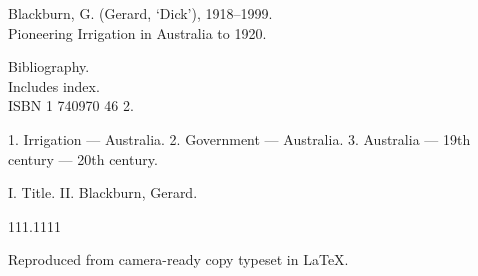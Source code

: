 \documentclass[11pt,b5paper,titlepage]{book}
\newcommand{\clearemptydoublepage}{\newpage{\pagestyle{empty}\cleardoublepage}}
\renewcommand{\headrulewidth}{0pt}%
\begin{document}
\begin{titlepage}
\begin{raggedright}
\medskip
Blackburn, G. (Gerard, `Dick'), 1918--1999.\\
Pioneering Irrigation in Australia to 1920.\\
\begin{list}{}{\setlength{\topsep}{0ex}\setlength{\itemsep}{0ex}\setlength{\leftmargin}{2.5ex}}
\item
Bibliography.\\
Includes index.\\
ISBN 1 740970 46 2.

\item
1. Irrigation --- Australia. 2. Government --- Australia. 3. Australia
   --- 19th century --- 20th century.

\item
I. Title. II. Blackburn, Gerard.

\end{list}
111.1111

\medskip
Reproduced from camera-ready copy typeset in \LaTeX.

\end{raggedright}
\clearemptydoublepage

\end{titlepage}


\pagestyle{plain}
\tableofcontents
\clearemptydoublepage

\clearemptydoublepage

\clearemptydoublepage

\mainmatter
\pagestyle{fancy}
\renewcommand{\headrulewidth}{0.4pt}
\fancyhead[LE,RO]{\sffamily \small \thepage}
\fancyfoot{}


\clearemptydoublepage

\clearemptydoublepage

\clearemptydoublepage

\clearemptydoublepage

\clearemptydoublepage

\clearemptydoublepage

\clearemptydoublepage

\clearemptydoublepage

\clearemptydoublepage

\clearemptydoublepage

\clearemptydoublepage

\clearemptydoublepage

\clearemptydoublepage

\clearemptydoublepage

\clearemptydoublepage

\backmatter

\clearemptydoublepage

\clearemptydoublepage

\clearemptydoublepage

{\small
\printindex
}
\end{document}
